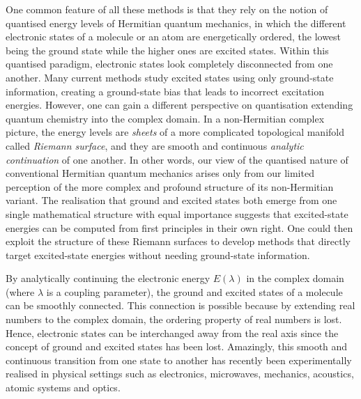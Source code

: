 \documentclass[aps,prb,reprint,noshowkeys,superscriptaddress]{revtex4-1}
\begin{document}
One common feature of all these methods is that they rely on the notion of quantised energy levels of Hermitian quantum mechanics, in which the different electronic states of a molecule or an atom are energetically ordered, the lowest being the ground state while the higher ones are excited states. 
Within this quantised paradigm, electronic states look completely disconnected from one another.
Many current methods study excited states using only ground-state information, creating a ground-state bias that leads to incorrect excitation energies.
However, one can gain a different perspective on quantisation extending quantum chemistry into the complex domain.
In a non-Hermitian complex picture, the energy levels are \textit{sheets} of a more complicated topological manifold called \textit{Riemann surface}, and they are smooth and continuous \textit{analytic continuation} of one another. 
In other words, our view of the quantised nature of conventional Hermitian quantum mechanics arises only from our limited perception of the more complex and profound structure of its non-Hermitian variant. \cite{MoiseyevBook,BenderPTBook}
The realisation that ground and excited states both emerge from one single mathematical structure with equal importance suggests that excited-state energies can be computed from first principles in their own right. 
One could then exploit the structure of these Riemann surfaces to develop methods that directly target excited-state energies without needing ground-state information. \cite{Burton_2019,Burton_2019a}

By analytically continuing the electronic energy $E(\lambda)$ in the complex domain (where $\lambda$ is a coupling parameter), the ground and excited states of a molecule can be smoothly connected.
This connection is possible because by extending real numbers to the complex domain, the ordering property of real numbers is lost.
Hence, electronic states can be interchanged away from the real axis since the concept of ground and excited states has been lost.
Amazingly, this smooth and continuous transition from one state to another has recently been experimentally realised in physical settings such as electronics, microwaves, mechanics, acoustics, atomic systems and optics. \cite{Bittner_2012,Chong_2011,Chtchelkatchev_2012,Doppler_2016,Guo_2009,Hang_2013,Liertzer_2012,Longhi_2010,Peng_2014, Peng_2014a,Regensburger_2012,Ruter_2010,Schindler_2011,Szameit_2011,Zhao_2010,Zheng_2013,Choi_2018,El-Ganainy_2018}
\end{document}
